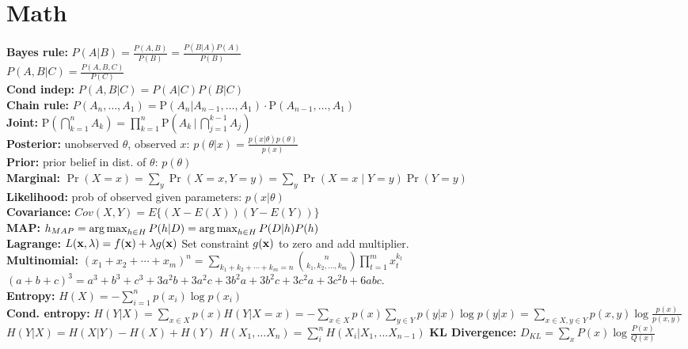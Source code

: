 \section{Math}
{\bf Bayes rule: } $P(A \vert B) = \frac{P(A, B)}{P(B)} = \frac{P(B \vert A) P(A)}{P(B)}$\\
$P(A,B \vert C) = \frac{P(A, B, C)}{P(C)}$ \\
{\bf Cond indep:} $P(A, B \vert C) = P(A \vert C)P(B \vert C)$\\
{\bf Chain rule: } $P(A_n, \ldots , A_1)  = \mathrm P(A_n | A_{n-1}, \ldots , A_1) \cdot\mathrm P( A_{n-1}, \ldots , A_1)$\\
{\bf Joint: } $\mathrm  P\left(\bigcap_{k=1}^n A_k\right)  = \prod_{k=1}^n  \mathrm P\left(A_k \,\Bigg|\, \bigcap_{j=1}^{k-1} A_j\right)$\\
{\bf Posterior:} unobserved $\theta$, observed $x$: $p(\theta \vert x) = \frac{p(x \vert \theta)p(\theta)}{p(x)}$\\
{\bf Prior:} prior belief in dist. of $\theta$: $p(\theta)$\\
{\bf Marginal: } $\Pr(X=x) = \sum_y \Pr(X=x,Y=y) = \sum_y \Pr(X=x\mid Y=y) \Pr(Y=y)$\\
{\bf Likelihood:} prob of observed given parameters: $p(x \vert \theta)$\\
{\bf Covariance:} $Cov(X,Y) = E\{(X - E(X))(Y- E(Y))\}$ \\
{\bf MAP:} $h_{MAP} = \operatorname*{arg\,max}_{h\in H} P(h \vert D) = \operatorname*{arg\,max}_{h\in H} P(D \vert h) P(h)$\\ 
{\bf Lagrange: } $L(\mathbf{x}, \lambda) = f(\mathbf{x}) + \lambda g(\mathbf{x})$
Set constraint $g(\mathbf{x})$ to zero and add multiplier. \\
{\bf Multinomial: } $(x_1 + x_2  + \cdots + x_m)^n 
 = \sum_{k_1+k_2+\cdots+k_m=n} {n \choose k_1, k_2, \ldots, k_m}
  \prod_{t=1}^m x_t^{k_t}\,$ \\
  $(a+b+c)^3 = a^3 + b^3 + c^3 + 3 a^2 b + 3 a^2 c + 3 b^2 a + 3 b^2 c + 3 c^2 a + 3 c^2 b + 6 a b c.$\\
{\bf Entropy: } $H(X)  = - \sum_{i=1}^n p(x_i)\log p(x_i)$\\
{\bf Cond. entropy:} $H(Y \vert X) = \sum_{x \in X} p(x) H(Y \vert X = x) = - \sum_{x \in X} p(x) \sum_{y \in Y}p(y \vert x) \log p(y \vert x) = \sum_{x \in X, y \in Y} p(x,y) \log \frac{p(x)}{p(x, y)}$\\
$H(Y \vert X) = H(X \vert Y) - H(X) + H(Y)$ 
$H(X_1, ... X_n) = \sum_{i}^{n} H(X_i \vert X_1, ... X_{n-1})$
{\bf KL Divergence: } $D_{KL} = \sum_{x} P(x) \log \frac{P(x)}{Q(x)}$ \\
